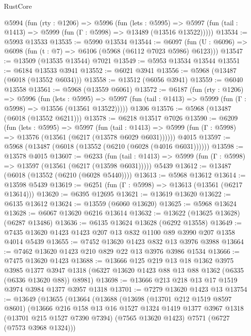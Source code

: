 \begin{lexlean}{RustCore}
\begin{coremodule}
  @5994
    (fun (rty : @1206) =>
    @5996
      (fun (lets : @5995) =>
      @5997 (fun (tail : @1413) => @5999 (fun (Γ : @5998) => @13489 (@13516 @13522)))))
@13534 := @5993 @13533
@13535 := @5990 @13534
@13544 := @6097 (fun (U : @6096) => @6098 (fun (t : @7) => @6106 (@5968 (@6112 @7023 @5986) @6123)))
@13547 := @13509 (@13535 @13544) @7021
@13549 := @5953 @13534 @13544
@13551 := @6184 @13533 @3941
@13552 := @6021 @3941
@13556 := @5968 (@13487 (@6018 (@13552 @6034)))
@13558 := @13512 (@6056 @3941)
@13559 := @6040 @13558
@13561 := @5968 (@13559 @6061)
@13572 := @6187
    (fun (rty : @1206) =>
    @5996
      (fun (lets : @5995) =>
      @5997 (fun (tail : @1413) => @5999 (fun (Γ : @5998) => @13556 (@13561 @13522)))))
    @1306
@13576 := @5968 (@13487 (@6018 (@13552 @6211)))
@13578 := @6218 @13517 @7026
@13590 := @6209
    (fun (lets : @5995) =>
    @5997
      (fun (tail : @1413) =>
      @5999 (fun (Γ : @5998) => @13576 (@13561 (@6217 (@13578 @6029 @6031))))))
    @4015
@13597 := @5968 (@13487 (@6018 (@13552 (@6210 (@6028 (@4016 @6031))))))
@13598 := @13578 @4015
@13607 := @6233
    (fun (tail : @1413) => @5999 (fun (Γ : @5998) => @13597 (@13561 (@6217 (@13598 @6031)))))
    @5439
@13612 := @13487 (@6018 (@13552 (@6210 (@6028 @5440))))
@13613 := @5968 @13612
@13614 := @13598 @5439
@13619 := @6251 (fun (Γ : @5998) => @13613 (@13561 (@6217 @13614)))
@13620 := @6395 @12695
@13621 := @13619 @13620
@13622 := @6135 @13612
@13624 := @13559 (@6060 @13620)
@13625 := @5968 @13624
@13628 := @6067 @13620 @6216 @13614
@13632 := @13622 (@13625 @13628) (@6287 @13486)
@13636 := @6135 @13624 @13628 (@6292 @13558)
@13649 := @7435 @13620 @1423 @1423 @207 @13 @832 @1100 @89 @3990 @207 @1358 @4014 @5439
@13655 := @7452 @13620 @1423 @832 @13 @3976 @3988
@13664 := @7462 @13620 @1423 @210 @829 @22 @13 @3976 @3986 @1534
@13666 := @7475 @13620 @1423
@13688 := @13666
    @125
    @219
    @13
    @18
    @1362
    @3975
    @3985
    @1377
    @3947
    @1318
    (@6327 @13620 @1423 @88 @13 @88 @1362 (@6335 (@6336 @13620 @88)) @8981)
@13698 := @13666 @213 @218 @13 @17 @1519 @3974 @3984 @1377 @3957 @1318
@13701 := @7279 @13620 @1423 @13
@13754 := @13649
    (@13655
      (@13664
        (@13688
          (@13698
            (@13701 @212 @1519 @8597 @8601)
            (@13666
              @216
              @158
              @13
              @16
              @1527
              @1324
              @1419
              @1377
              @3967
              @1318
              (@13701 @215 @1527 @7390 @7394)
              (@7565 @13620 @1423)
              @7571
              (@6727 (@7573 @3968 @1324)))

\end{coremodule}
\end{lexlean}

